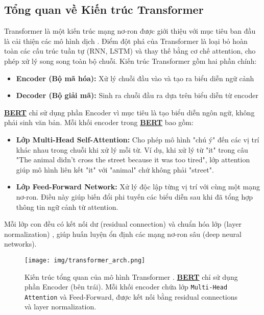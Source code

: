 \subsection{Tổng quan về Kiến trúc Transformer}
\label{ssec:tong_quan_transformer}
Transformer là một kiến trúc mạng nơ-ron được giới thiệu với mục tiêu ban đầu là cải thiện các mô hình dịch \cite{vaswani2017attention}.
Điểm đột phá của Transformer là loại bỏ hoàn toàn các cấu trúc tuần tự (RNN, LSTM) và thay thế bằng cơ chế attention, cho phép xử lý song song toàn bộ chuỗi.
Kiến trúc Transformer gồm hai phần chính:
\begin{itemize}
    \item \textbf{Encoder (Bộ mã hóa):} Xử lý chuỗi đầu vào và tạo ra biểu diễn ngữ cảnh
    \item \textbf{Decoder (Bộ giải mã):} Sinh ra chuỗi đầu ra dựa trên biểu diễn từ encoder
\end{itemize}

\hyperref[acro:bert]{\textbf{BERT}} chỉ sử dụng phần Encoder vì mục tiêu là tạo biểu diễn ngôn ngữ, không phải sinh văn bản.
Mỗi khối encoder trong \hyperref[acro:bert]{\textbf{BERT}} bao gồm:
\begin{itemize}
    \item \textbf{Lớp Multi-Head Self-Attention:} Cho phép mô hình "chú ý" đến các vị trí khác nhau trong chuỗi khi xử lý mỗi từ.
    Ví dụ, khi xử lý từ "it" trong câu "The animal didn't cross the street because it was too tired", lớp attention giúp mô hình liên kết "it" với "animal" chứ không phải "street".
    \item \textbf{Lớp Feed-Forward Network:} Xử lý độc lập từng vị trí với cùng một mạng nơ-ron.
    Điều này giúp biến đổi phi tuyến các biểu diễn sau khi đã tổng hợp thông tin ngữ cảnh từ attention.
\end{itemize}

Mỗi lớp con đều có kết nối dư (residual connection) và chuẩn hóa lớp (layer normalization) \cite{ba2016layer}, giúp huấn luyện ổn định các mạng nơ-ron sâu (deep neural networks).
\begin{figure}[H]
    \centering
    \texttt{[image: img/transformer\_arch.png]}
    \caption{Kiến trúc tổng quan của mô hình Transformer \cite{vaswani2017attention}.
    \hyperref[acro:bert]{\textbf{BERT}} chỉ sử dụng phần Encoder (bên trái). Mỗi khối encoder chứa lớp \texttt{Multi-Head Attention} và Feed-Forward, được kết nối bằng residual connections và layer normalization.}
    \label{fig:transformer_architecture}
\end{figure}

